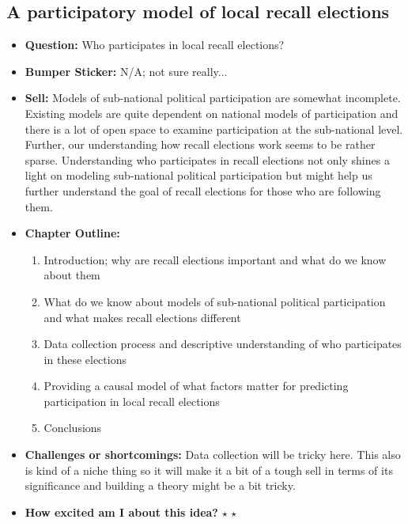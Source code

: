 \documentclass[12pt]{article}
\begin{document}
\subsection{A participatory model of local recall elections}
    \begin{itemize}
        \item \textbf{Question:} Who participates in local recall elections?
        \item \textbf{Bumper Sticker:} N/A; not sure really...
        \item \textbf{Sell:} Models of sub-national political participation are somewhat incomplete. Existing models are quite dependent on national models of participation and there is a lot of open space to examine participation at the sub-national level. Further, our understanding how recall elections work seems to be rather sparse. Understanding who participates in recall elections not only shines a light on modeling sub-national political participation but might help us further understand the goal of recall elections for those who are following them.
        \item \textbf{Chapter Outline:}
        \begin{enumerate}
            \item Introduction; why are recall elections important and what do we know about them
            \item What do we know about models of sub-national political participation and what makes recall elections different
            \item Data collection process and descriptive understanding of who participates in these elections
            \item Providing a causal model of what factors matter for predicting participation in local recall elections
            \item Conclusions
        \end{enumerate}
        \item \textbf{Challenges or shortcomings:} Data collection will be tricky here. This also is kind of a niche thing so it will make it a bit of a tough sell in terms of its significance and building a theory might be a bit tricky.
        \item \textbf{How excited am I about this idea?} $\star$ $\star$
    \end{itemize}
\end{document}
